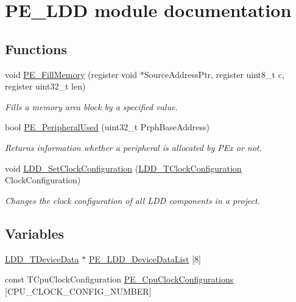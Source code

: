 \hypertarget{group___p_e___l_d_d__module}{}\section{P\+E\+\_\+\+L\+DD module documentation}
\label{group___p_e___l_d_d__module}
\subsection*{Functions}
\begin{DoxyCompactItemize}
\item 
void \hyperlink{group___p_e___l_d_d__module_ga6cb22864b71fd00f200c9fb3375f4e29}{P\+E\+\_\+\+Fill\+Memory} (register void $\ast$Source\+Address\+Ptr, register uint8\+\_\+t c, register uint32\+\_\+t len)
\begin{DoxyCompactList}\small\item\em Fills a memory area block by a specified value. \end{DoxyCompactList}\item 
bool \hyperlink{group___p_e___l_d_d__module_ga9e049b01a45212fe5b6a8476fe124b59}{P\+E\+\_\+\+Peripheral\+Used} (uint32\+\_\+t Prph\+Base\+Address)
\begin{DoxyCompactList}\small\item\em Returns information whether a peripheral is allocated by P\+Ex or not. \end{DoxyCompactList}\item 
void \hyperlink{group___p_e___l_d_d__module_ga7fe8a131453ba765c5e85130a282eafb}{L\+D\+D\+\_\+\+Set\+Clock\+Configuration} (\hyperlink{group___p_e___types__module_ga369bcaf7f00caad5f994c72ac2629a37}{L\+D\+D\+\_\+\+T\+Clock\+Configuration} Clock\+Configuration)
\begin{DoxyCompactList}\small\item\em Changes the clock configuration of all L\+DD components in a project. \end{DoxyCompactList}\end{DoxyCompactItemize}
\subsection*{Variables}
\begin{DoxyCompactItemize}
\item 
\hyperlink{group___p_e___types__module_gac5cf1362f1f0e3a2ce71b1bf2276d091}{L\+D\+D\+\_\+\+T\+Device\+Data} $\ast$ \hyperlink{group___p_e___l_d_d__module_ga82b60cfd279bc3cf17d8c2ebe030eac8}{P\+E\+\_\+\+L\+D\+D\+\_\+\+Device\+Data\+List} \mbox{[}8\mbox{]}
\item 
const T\+Cpu\+Clock\+Configuration \hyperlink{group___p_e___l_d_d__module_gab69281f0e90d16198a5595ed7f471441}{P\+E\+\_\+\+Cpu\+Clock\+Configurations} \mbox{[}C\+P\+U\+\_\+\+C\+L\+O\+C\+K\+\_\+\+C\+O\+N\+F\+I\+G\+\_\+\+N\+U\+M\+B\+ER\mbox{]}
\end{DoxyCompactItemize}


